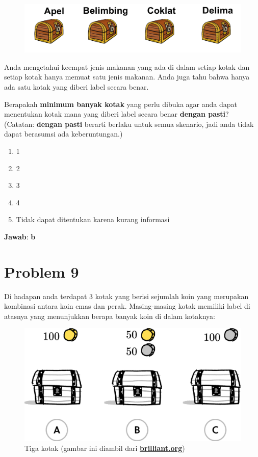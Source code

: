 \documentclass{article}
\theoremstyle{plain}
\begin{document}
\begin{figure}[!ht]
	\centering
	\includegraphics[scale=.25]{images/soal-nomor-9}
\end{figure}

\noindent Anda mengetahui keempat jenis makanan yang ada di dalam setiap kotak dan setiap kotak hanya memuat satu jenis makanan. Anda juga tahu bahwa hanya ada satu kotak yang diberi label secara benar.

\bigskip
\noindent Berapakah \textbf{minimum banyak kotak} yang perlu dibuka agar anda dapat menentukan kotak mana yang diberi label secara benar \textbf{dengan pasti}? (Catatan: \textbf{dengan pasti} berarti berlaku untuk semua skenario, jadi anda tidak dapat berasumsi ada keberuntungan.) 

	\begin{enumerate}[-,topsep=0pt, nosep,label=\alph*. ]
		\item 1
		\item 2
		\item 3
		\item 4
		\item Tidak dapat ditentukan karena kurang informasi
	\end{enumerate}

\bigskip
\noindent \textbf{Jawab}: \textbf{b}

\newpage
\section*{Problem 9}
Di hadapan anda terdapat 3 kotak yang berisi sejumlah koin yang merupakan kombinasi antara koin emas dan perak. Masing-masing kotak memiliki label di atasnya yang menunjukkan berapa banyak koin di dalam kotaknya:

\begin{figure}[!ht]
	\centering
	\includegraphics[scale=.12]{images/brilliant}
	\caption{Tiga kotak (gambar ini diambil dari \href{https://brilliant.org}{\textbf{brilliant.org}})}
\end{figure}
\end{document}
